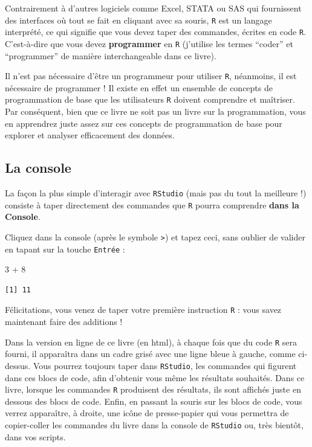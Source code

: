 \documentclass[
  a4paper,
  DIV=11,
  numbers=noendperiod,
  oneside]{scrreprt}
\newenvironment{Shaded}{}{}
\newcommand{\DecValTok}[1]{\textcolor[rgb]{0.00,0.36,0.77}{#1}}
\newcommand{\SpecialCharTok}[1]{\textcolor[rgb]{0.00,0.36,0.77}{#1}}
\begin{document}
Contrairement à d'autres logiciels comme Excel, STATA ou SAS qui
fournissent des interfaces où tout se fait en cliquant avec sa souris,
\texttt{R} est un langage interprété, ce qui signifie que vous devez
taper des commandes, écrites en code \texttt{R}. C'est-à-dire que vous
devez \textbf{programmer} en \texttt{R} (j'utilise les termes ``coder''
et ``programmer'' de manière interchangeable dans ce livre).

Il n'est pas nécessaire d'être un programmeur pour utiliser \texttt{R},
néanmoins, il est nécessaire de programmer ! Il existe en effet un
ensemble de concepts de programmation de base que les utilisateurs
\texttt{R} doivent comprendre et maîtriser. Par conséquent, bien que ce
livre ne soit pas un livre sur la programmation, vous en apprendrez
juste assez sur ces concepts de programmation de base pour explorer et
analyser efficacement des données.

\subsection{La console}\label{la-console}

La façon la plus simple d'interagir avec \texttt{RStudio} (mais pas du
tout la meilleure !) consiste à taper directement des commandes que
\texttt{R} pourra comprendre \textbf{dans la Console}.

Cliquez dans la console (après le symbole \texttt{\textgreater{}}) et
tapez ceci, sans oublier de valider en tapant sur la touche
\texttt{Entrée} :

\begin{Shaded}
\begin{Highlighting}[]
\DecValTok{3} \SpecialCharTok{+} \DecValTok{8}
\end{Highlighting}
\end{Shaded}

\begin{verbatim}
[1] 11
\end{verbatim}

Félicitations, vous venez de taper votre première instruction \texttt{R}
: vous savez maintenant faire des additions !

Dans la version en ligne de ce livre (en html), à chaque fois que du
code \texttt{R} sera fourni, il apparaîtra dans un cadre grisé avec une
ligne bleue à gauche, comme ci-dessus. Vous pourrez toujours taper dans
\texttt{RStudio}, les commandes qui figurent dans ces blocs de code,
afin d'obtenir vous même les résultats souhaités. Dans ce livre, lorsque
les commandes \texttt{R} produisent des résultats, ils sont affichés
juste en dessous des blocs de code. Enfin, en passant la souris sur les
blocs de code, vous verrez apparaître, à droite, une icône de
presse-papier qui vous permettra de copier-coller les commandes du livre
dans la console de \texttt{RStudio} ou, très bientôt, dans vos scripts.
\end{document}
